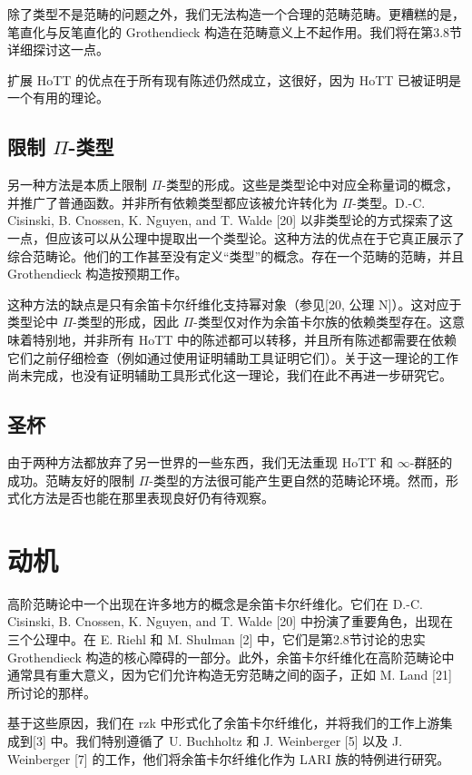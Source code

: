 \documentclass{ctexrep}
\theoremstyle{plain}
\theoremstyle{definition}
\theoremstyle{remark}
\theoremstyle{definition}
\theoremstyle{definition}
\theoremstyle{definition}
\begin{document}
除了类型不是范畴的问题之外，我们无法构造一个合理的范畴范畴。更糟糕的是，笔直化与反笔直化的 Grothendieck 构造在范畴意义上不起作用。我们将在第3.8节详细探讨这一点。

扩展 HoTT 的优点在于所有现有陈述仍然成立，这很好，因为 HoTT 已被证明是一个有用的理论。

\subsection{限制 $\Pi$-类型}

另一种方法是本质上限制 $\Pi$-类型的形成。这些是类型论中对应全称量词的概念，并推广了普通函数。并非所有依赖类型都应该被允许转化为 $\Pi$-类型。D.-C. Cisinski, B. Cnossen, K. Nguyen, and T. Walde [20] 以非类型论的方式探索了这一点，但应该可以从公理中提取出一个类型论。这种方法的优点在于它真正展示了综合范畴论。他们的工作甚至没有定义“类型”的概念。存在一个范畴的范畴，并且 Grothendieck 构造按预期工作。

这种方法的缺点是只有余笛卡尔纤维化支持幂对象（参见[20, 公理 N]）。这对应于类型论中 $\Pi$-类型的形成，因此 $\Pi$-类型仅对作为余笛卡尔族的依赖类型存在。这意味着特别地，并非所有 HoTT 中的陈述都可以转移，并且所有陈述都需要在依赖它们之前仔细检查（例如通过使用证明辅助工具证明它们）。关于这一理论的工作尚未完成，也没有证明辅助工具形式化这一理论，我们在此不再进一步研究它。

\subsection{圣杯}

由于两种方法都放弃了另一世界的一些东西，我们无法重现 HoTT 和 $\infty$-群胚的成功。范畴友好的限制 $\Pi$-类型的方法很可能产生更自然的范畴论环境。然而，形式化方法是否也能在那里表现良好仍有待观察。

\section{动机}

高阶范畴论中一个出现在许多地方的概念是余笛卡尔纤维化。它们在 D.-C. Cisinski, B. Cnossen, K. Nguyen, and T. Walde [20] 中扮演了重要角色，出现在三个公理中。在 E. Riehl 和 M. Shulman [2] 中，它们是第2.8节讨论的忠实 Grothendieck 构造的核心障碍的一部分。此外，余笛卡尔纤维化在高阶范畴论中通常具有重大意义，因为它们允许构造无穷范畴之间的函子，正如 M. Land [21] 所讨论的那样。

基于这些原因，我们在 \textsf{rzk} 中形式化了余笛卡尔纤维化，并将我们的工作上游集成到[3] 中。我们特别遵循了 U. Buchholtz 和 J. Weinberger [5] 以及 J. Weinberger [7] 的工作，他们将余笛卡尔纤维化作为 LARI 族的特例进行研究。
\end{document}
